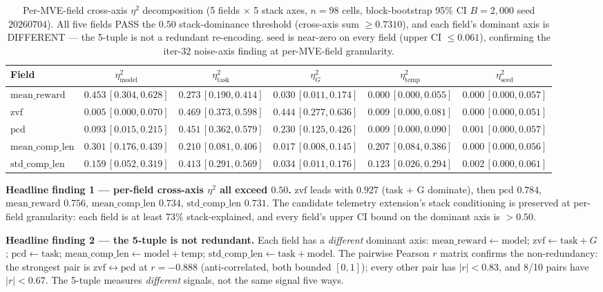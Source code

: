 \documentclass{article}  \usepackage[preprint,nonatbib]{neurips_2026} \usepackage[numbers]{natbib}
\begin{document}
\begin{table}[t]
\centering\small
\caption{Per-MVE-field cross-axis $\eta^2$ decomposition (5 fields
$\times$ 5 stack axes, $n{=}98$ cells, block-bootstrap 95\% CI
$B{=}2{,}000$ seed $20260704$). All five fields PASS the
$0.50$ stack-dominance threshold (cross-axis sum
$\geq 0.7310$), and each field's dominant axis is DIFFERENT —
the 5-tuple is not a redundant re-encoding. $\mathrm{seed}$ is
near-zero on every field (upper CI $\leq 0.061$), confirming the
iter-32 noise-axis finding at per-MVE-field granularity.}
\label{tab:p5-mve-field}
\begin{tabular}{lccccc}
\toprule
Field & $\eta^2_{\mathrm{model}}$ & $\eta^2_{\mathrm{task}}$ &
$\eta^2_G$ & $\eta^2_{\mathrm{temp}}$ & $\eta^2_{\mathrm{seed}}$ \\
\midrule
$\mathrm{mean\_reward}$ &
$0.453\,[0.304,0.628]$ & $0.273\,[0.190,0.414]$ &
$0.030\,[0.011,0.174]$ & $0.000\,[0.000,0.055]$ &
$0.000\,[0.000,0.057]$ \\
$\mathrm{zvf}$ &
$0.005\,[0.000,0.070]$ & $0.469\,[0.373,0.598]$ &
$0.444\,[0.277,0.636]$ & $0.009\,[0.000,0.081]$ &
$0.000\,[0.000,0.051]$ \\
$\mathrm{pcd}$ &
$0.093\,[0.015,0.215]$ & $0.451\,[0.362,0.579]$ &
$0.230\,[0.125,0.426]$ & $0.009\,[0.000,0.090]$ &
$0.001\,[0.000,0.057]$ \\
$\mathrm{mean\_comp\_len}$ &
$0.301\,[0.176,0.439]$ & $0.210\,[0.081,0.406]$ &
$0.017\,[0.008,0.145]$ & $0.207\,[0.084,0.386]$ &
$0.000\,[0.000,0.056]$ \\
$\mathrm{std\_comp\_len}$ &
$0.159\,[0.052,0.319]$ & $0.413\,[0.291,0.569]$ &
$0.034\,[0.011,0.176]$ & $0.123\,[0.026,0.294]$ &
$0.002\,[0.000,0.061]$ \\
\bottomrule
\end{tabular}
\end{table}

\textbf{Headline finding 1 — per-field cross-axis $\eta^2$ all exceed
$0.50$.} $\mathrm{zvf}$ leads with $0.927$ (task + G dominate), then
$\mathrm{pcd}$ $0.784$, $\mathrm{mean\_reward}$ $0.756$,
$\mathrm{mean\_comp\_len}$ $0.734$, $\mathrm{std\_comp\_len}$
$0.731$. The candidate telemetry extension's stack conditioning is preserved at
per-field granularity: each field is at least $73\%$ stack-explained,
and every field's upper CI bound on the dominant axis is
$>\!0.50$.

\textbf{Headline finding 2 — the 5-tuple is not redundant.} Each
field has a \emph{different} dominant axis:
$\mathrm{mean\_reward} \leftarrow \mathrm{model}$;
$\mathrm{zvf} \leftarrow \mathrm{task} + G$;
$\mathrm{pcd} \leftarrow \mathrm{task}$;
$\mathrm{mean\_comp\_len} \leftarrow \mathrm{model} + \mathrm{temp}$;
$\mathrm{std\_comp\_len} \leftarrow \mathrm{task} + \mathrm{model}$.
The pairwise Pearson $r$ matrix confirms the non-redundancy: the
strongest pair is $\mathrm{zvf} \leftrightarrow \mathrm{pcd}$
at $r = -0.888$ (anti-correlated, both bounded $[0,1]$); every other
pair has $|r| < 0.83$, and 8/10 pairs have $|r| < 0.67$. The
5-tuple measures \emph{different} signals, not the same signal five
ways.
\end{document}
